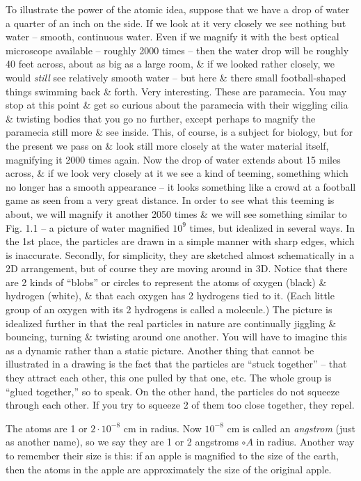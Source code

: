 \documentclass{article}
\begin{document}
To illustrate the power of the atomic idea, suppose that we have a drop of water a quarter of an inch on the side. If we look at it very closely we see nothing but water -- smooth, continuous water. Even if we magnify it with the best optical microscope available -- roughly 2000 times -- then the water drop will be roughly 40 feet across, about as big as a large room, \& if we looked rather closely, we would {\it still} see relatively smooth water -- but here \& there small football-shaped things swimming back \& forth. Very interesting. These are paramecia. You may stop at this point \& get so curious about the paramecia with their wiggling cilia \& twisting bodies that you go no further, except perhaps to magnify the paramecia still more \& see inside. This, of course, is a subject for biology, but for the present we pass on \& look still more closely at the water material itself, magnifying it 2000 times again. Now the drop of water extends about 15 miles across, \& if we look very closely at it we see a kind of teeming, something which no longer has a smooth appearance -- it looks something like a crowd at a football game as seen from a very great distance. In order to see what this teeming is about, we will magnify it another 2050 times \& we will see something similar to {\sf Fig. 1.1} -- a picture of water magnified $10^9$ times, but idealized in several ways. In the 1st place, the particles are drawn in a simple manner with sharp edges, which is inaccurate. Secondly, for simplicity, they are sketched almost schematically in a 2D arrangement, but of course they are moving around in 3D. Notice that there are 2 kinds of ``blobs'' or circles to represent the atoms of oxygen (black) \& hydrogen (white), \& that each oxygen has 2 hydrogens tied to it. (Each little group of an oxygen with its 2 hydrogens is called a molecule.) The picture is idealized further in that the real particles in nature are continually jiggling \& bouncing, turning \& twisting around one another. You will have to imagine this as a dynamic rather than a static picture. Another thing that cannot be illustrated in a drawing is the fact that the particles are ``stuck together'' -- that they attract each other, this one pulled by that one, etc. The whole group is ``glued together,'' so to speak. On the other hand, the particles do not squeeze through each other. If you try to squeeze 2 of them too close together, they repel.

The atoms are 1 or $2\cdot10^{-8}$ cm in radius. Now $10^{-8}$ cm is called an {\it angstrom} (just as another name), so we say they are 1 or 2 angstroms $\circ{A}$ in radius. Another way to remember their size is this: if an apple is magnified to the size of the earth, then the atoms in the apple are approximately the size of the original apple.
\end{document}

